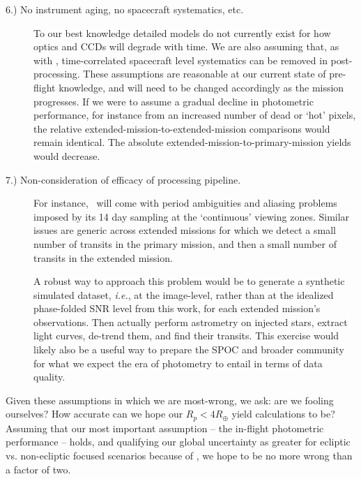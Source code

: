 \begin{description}
	
	\item[6.) No instrument aging, no spacecraft systematics, etc.]
	To our best knowledge detailed models do not currently exist for how \tesss optics and CCDs will degrade with time.
	We are also assuming that, as with \ktwo, time-correlated spacecraft level systematics can be removed in post-processing.
	These assumptions are reasonable at our current state of pre-flight knowledge, and will need to be changed accordingly as the mission progresses.
	If we were to assume a gradual decline in photometric performance, for instance from an increased number of dead or `hot' pixels, the relative extended-mission-to-extended-mission comparisons would remain identical.
	The absolute extended-mission-to-primary-mission yields would decrease.
	
	\item[7.) Non-consideration of efficacy of processing pipeline.]
	For instance, \hemis\ will come with period ambiguities and aliasing problems imposed by its 14 day sampling at the `continuous' viewing zones.
	Similar issues are generic across extended missions for which we detect a small number of transits in the primary mission, and then a small number of transits in the extended mission.
	
	A robust way to approach this problem would be to generate a synthetic simulated \tess dataset, \textit{i.e.}, at the image-level, rather than at the idealized phase-folded SNR level from this work, for each extended mission's observations.
	Then actually perform astrometry on injected stars, extract light curves, de-trend them, and find their transits.
	This exercise would likely also be a useful way to prepare the SPOC and broader community for what we expect the era of \tess photometry to entail in terms of data quality.	
\end{description}

Given these assumptions in which we are most-wrong, we ask: are we fooling ourselves? How accurate can we hope our $R_p<4R_\oplus$ yield calculations to be?
Assuming that our most important assumption -- the in-flight photometric performance -- holds, and qualifying our global uncertainty as greater for ecliptic vs. non-ecliptic focused scenarios because of \ktwo\!, we hope to be no more wrong than a factor of two.

